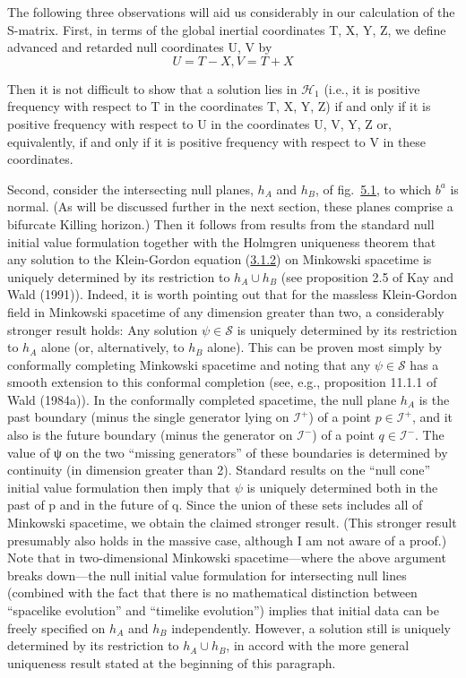 \documentclass[11pt,a4paper]{article}
\begin{document}
The following three observations will aid us considerably in our calculation of the S-matrix. First, in terms of the global inertial coordinates T, X, Y, Z, we define advanced and retarded null coordinates U, V by
\begin{equation*}
U = T - X, V = T + X \tag{5.1.4}\label{eq:5.1.4}
\end{equation*}

Then it is not difficult to show that a solution lies in \(\mathcal{H}_1\) (i.e., it is positive frequency with respect to T in the coordinates T, X, Y, Z) if and only if it is positive frequency with respect to U in the coordinates U, V, Y, Z or, equivalently, if and only if it is positive frequency with respect to V in these coordinates.

Second, consider the intersecting null planes, \(h_A\) and \(h_B\), of fig.~\hyperref[fig:5.1]{5.1}, to which \(b^a\) is normal. (As will be discussed further in the next section, these planes comprise a bifurcate Killing horizon.) Then it follows from results from the standard null initial value formulation together with the Holmgren uniqueness theorem that any solution to the Klein-Gordon equation (\hyperref[eq:3.1.2]{3.1.2}) on Minkowski spacetime is uniquely determined by its restriction to \(h_A \cup h_B\) (see proposition 2.5 of Kay and Wald (1991)). Indeed, it is worth pointing out that for the massless Klein-Gordon field in Minkowski spacetime of any dimension greater than two, a considerably stronger result holds: Any solution \(\psi \in \mathcal{S}\) is uniquely determined by its restriction to \(h_A\) alone (or, alternatively, to \(h_B\) alone). This can be proven most simply by conformally completing Minkowski spacetime and noting that any \(\psi \in \mathcal{S}\) has a smooth extension to this conformal completion (see, e.g., proposition 11.1.1 of Wald (1984a)). In the conformally completed spacetime, the null plane \(h_A\) is the past boundary (minus the single generator lying on \(\mathscr I^+\)) of a point \(p\in\mathscr I^+\), and it also is the future boundary (minus the generator on \(\mathscr I^-\)) of a point \(q\in\mathscr I^-\). The value of ψ on the two ``missing generators'' of these boundaries is determined by continuity (in dimension greater than 2). Standard results on the ``null cone'' initial value formulation then imply that \(\psi\) is uniquely \hypertarget{source-123}{} determined both in the past of p and in the future of q. Since the union of these sets includes all of Minkowski spacetime, we obtain the claimed stronger result. (This stronger result presumably also holds in the massive case, although I am not aware of a proof.) Note that in two-dimensional Minkowski spacetime---where the above argument breaks down---the null initial value formulation for intersecting null lines (combined with the fact that there is no mathematical distinction between ``spacelike evolution'' and ``timelike evolution'') implies that initial data can be freely specified on \(h_A\) and \(h_B\) independently. However, a solution still is uniquely determined by its restriction to \(h_A\cup h_B\), in accord with the more general uniqueness result stated at the beginning of this paragraph.
\end{document}
